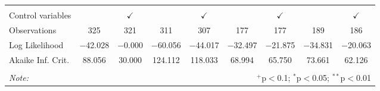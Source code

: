 \begin{table}[!htbp]
\begin{tabular}{@{\extracolsep{5pt}}lcccccccc}
\hline \\[-1.8ex] 
Control variables &  & $\checkmark$ &  & $\checkmark$ &  & $\checkmark$ &  & $\checkmark$ \\ 
Observations & 325 & 321 & 311 & 307 & 177 & 177 & 189 & 186 \\ 
Log Likelihood & $-$42.028 & $-$0.000 & $-$60.056 & $-$44.017 & $-$32.497 & $-$21.875 & $-$34.831 & $-$20.063 \\ 
Akaike Inf. Crit. & 88.056 & 30.000 & 124.112 & 118.033 & 68.994 & 65.750 & 73.661 & 62.126 \\ 
\hline 
\hline \\[-1.8ex] 
\textit{Note:}  & \multicolumn{8}{r}{$^{+}$p$<$0.1; $^{*}$p$<$0.05; $^{**}$p$<$0.01}} \\ 
\end{tabular} 
\end{table} 
